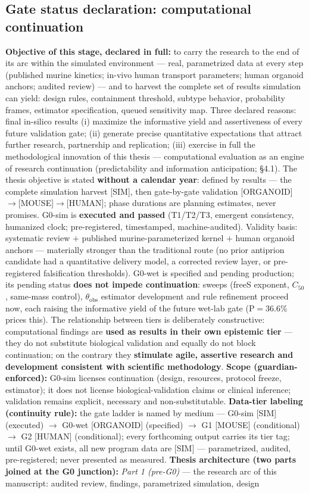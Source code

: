 \documentclass[10pt,twocolumn]{article}
\begin{document}
\subsection{Gate status declaration: computational continuation}
\textbf{Objective of this stage, declared in full:} to carry the research to the end of its arc within the simulated environment --- real, parametrized data at every step (published murine kinetics; in-vivo human transport parameters; human organoid anchors; audited review) --- and to harvest the complete set of results simulation can yield: design rules, containment threshold, subtype behavior, probability frames, estimator specification, queued sensitivity map. Three declared reasons: final in-silico results (i) maximize the informative yield and assertiveness of every future validation gate; (ii) generate precise quantitative expectations that attract further research, partnership and replication; (iii) exercise in full the methodological innovation of this thesis --- computational evaluation as an engine of research continuation (predictability and information anticipation; \S4.1). The thesis objective is stated \textbf{without a calendar year}: defined by results --- the complete simulation harvest [SIM], then gate-by-gate validation [ORGANOID]$\to$[MOUSE]$\to$[HUMAN]; phase durations are planning estimates, never promises. G0-sim is \textbf{executed and passed} (T1/T2/T3, emergent consistency, humanized clock; pre-registered, timestamped, machine-audited). Validity basis: systematic review $+$ published murine-parameterized kernel $+$ human organoid anchors --- materially stronger than the traditional route (no prior antiprion candidate had a quantitative delivery model, a corrected review layer, or pre-registered falsification thresholds). G0-wet is specified and pending production; its pending status \textbf{does not impede continuation}: sweeps (freeS exponent, $C_{50}$, same-mass control), $\theta_{\text{obs}}$ estimator development and rule refinement proceed now, each raising the informative yield of the future wet-lab gate (P$=$36.6\% prices this). The relationship between tiers is deliberately constructive: computational findings are \textbf{used as results in their own epistemic tier} --- they do not substitute biological validation and equally do not block continuation; on the contrary they \textbf{stimulate agile, assertive research and development consistent with scientific methodology}. \textbf{Scope (guardian-enforced):} G0-sim licenses continuation (design, resources, protocol freeze, estimator); it does not license biological-validation claims or clinical inference; validation remains explicit, necessary and non-substitutable. \textbf{Data-tier labeling (continuity rule):} the gate ladder is named by medium --- G0-sim [SIM] (executed) $\to$ G0-wet [ORGANOID] (specified) $\to$ G1 [MOUSE] (conditional) $\to$ G2 [HUMAN] (conditional); every forthcoming output carries its tier tag; until G0-wet exists, all new program data are [SIM] --- parametrized, audited, pre-registered; never presented as measured. \textbf{Thesis architecture (two parts joined at the G0 junction):} \emph{Part 1 (pre-G0)} --- the research arc of this manuscript: audited review, findings, parametrized simulation, design 
\end{document}
